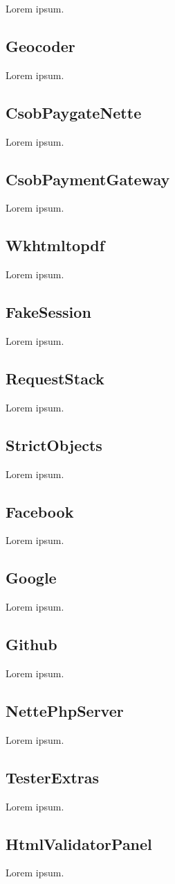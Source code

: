 Lorem ipsum.

\subsection{Geocoder}

Lorem ipsum.

\subsection{CsobPaygateNette}

Lorem ipsum.

\subsection{CsobPaymentGateway}

Lorem ipsum.

\subsection{Wkhtmltopdf}

Lorem ipsum.

\subsection{FakeSession}

Lorem ipsum.

\subsection{RequestStack}

Lorem ipsum.

\subsection{StrictObjects}

Lorem ipsum.

\subsection{Facebook}

Lorem ipsum.

\subsection{Google}

Lorem ipsum.

\subsection{Github}

Lorem ipsum.

\subsection{NettePhpServer}

Lorem ipsum.

\subsection{TesterExtras}

Lorem ipsum.

\subsection{HtmlValidatorPanel}

Lorem ipsum.
